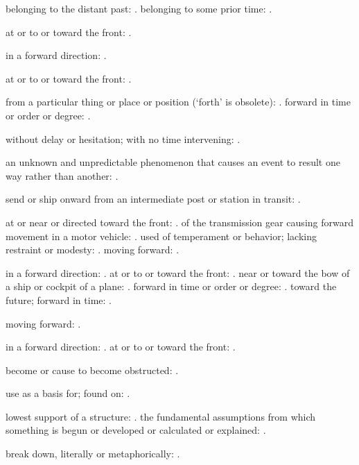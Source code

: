   belonging to the distant past: . belonging to some prior time: .

  at or to or toward the front: .

  in a forward direction: .

  at or to or toward the front: .

  from a particular thing or place or position (`forth' is obsolete): . forward in time or order or degree: .

  without delay or hesitation; with no time intervening: .

  an unknown and unpredictable phenomenon that causes an event to result one way rather than another: .

  send or ship onward from an intermediate post or station in transit: .

  at or near or directed toward the front: . of the transmission gear causing forward movement in a motor vehicle: . used of temperament or behavior; lacking restraint or modesty: . moving forward: .

  in a forward direction: . at or to or toward the front: . near or toward the bow of a ship or cockpit of a plane: . forward in time or order or degree: . toward the future; forward in time: .

  moving forward: .

  in a forward direction: . at or to or toward the front: .

  become or cause to become obstructed: .

  use as a basis for; found on: .

  lowest support of a structure: . the fundamental assumptions from which something is begun or developed or calculated or explained: .

  break down, literally or metaphorically: .

